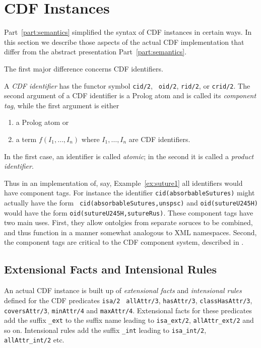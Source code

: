 
\section{CDF Instances} \label{sec:instance}

Part~\ref{part:semantics} simplified the syntax of CDF instances in
certain ways.  In this section we describe those aspects of the actual
CDF implementation that differ from the abstract presentation
Part~\ref{part:semantics}.

The first major difference concerns CDF identifiers.

\begin{definition} \label{def:cdfids}
A {\em CDF identifier} has the functor symbol {\tt cid/2}, {\tt
oid/2}, {\tt rid/2}, or {\tt crid/2}.  The second argument of a CDF
identifier is a Prolog atom and is called its {\em component tag},
while the first argument is either
\begin{enumerate}
\item a Prolog atom or 
\item a term $f(I_1,\ldots,I_n)$ where $I_1,\ldots,I_n$ are CDF identifiers.
\end{enumerate}
In the first case, an identifier is called {\em atomic}; in the second
it is called a {\em product identifier}.
\end{definition}

Thus in an implementation of, say, Example~\ref{ex:suture1} all
identifiers would have component tags.  For instance the identifier
{\tt cid(absorbableSutures)} might actually have the form {\tt
cid(absorbableSutures,unspsc)} and {\tt oid(sutureU245H)} would have
the form {\tt oid(sutureU245H,sutureRus)}.  These component tags have
two main uses.  First, they allow ontolgies from separate soruces to
be combined, and thus function in a manner somewhat analogous to XML
namespaces.  Second, the component tags are critical to the CDF
component system, described in .

\subsection{Extensional Facts and Intensional Rules}

 
%
An actual CDF instance is built up of {\em extensional facts} and {\em
intensional rules} defined for the CDF predicates {\tt isa/2} {\tt
allAttr/3}, {\tt hasAttr/3}, {\tt classHasAttr/3}, {\tt coversAttr/3},
{\tt minAttr/4} and {\tt maxAttr/4}.  Extensional facts for these
predicates add the suffix {\tt \_ext} to the suffix name leading to
{\tt isa\_ext/2}, {\tt allAttr\_ext/2} and so on.  Intensional rules
add the suffix {\tt \_int} leading to {\tt isa\_int/2}, {\tt
allAttr\_int/2} etc.

